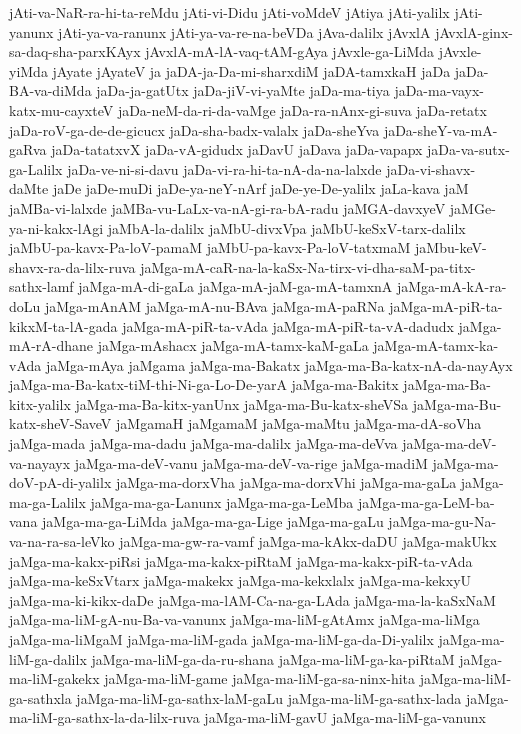 {jAti-va-NaR-ra-hi-ta-reMdu
jAti-vi-Didu
jAti-voMdeV
jAtiya
jAti-yalilx
jAti-yanunx
jAti-ya-va-ranunx
jAti-ya-va-re-na-beVDa
jAva-dalilx
jAvxlA
jAvxlA-ginx-sa-daq-sha-parxKAyx
jAvxlA-mA-lA-vaq-tAM-gAya
jAvxle-ga-LiMda
jAvxle-yiMda
jAyate
jAyateV
ja
jaDA-ja-Da-mi-sharxdiM
jaDA-tamxkaH
jaDa
jaDa-BA-va-diMda
jaDa-ja-gatUtx
jaDa-jiV-vi-yaMte
jaDa-ma-tiya
jaDa-ma-vayx-katx-mu-cayxteV
jaDa-neM-da-ri-da-vaMge
jaDa-ra-nAnx-gi-suva
jaDa-retatx
jaDa-roV-ga-de-de-gicucx
jaDa-sha-badx-valalx
jaDa-sheYva
jaDa-sheY-va-mA-gaRva
jaDa-tatatxvX
jaDa-vA-gidudx
jaDavU
jaDava
jaDa-vapapx
jaDa-va-sutx-ga-Lalilx
jaDa-ve-ni-si-davu
jaDa-vi-ra-hi-ta-nA-da-na-lalxde
jaDa-vi-shavx-daMte
jaDe
jaDe-muDi
jaDe-ya-neY-nArf
jaDe-ye-De-yalilx
jaLa-kava
jaM
jaMBa-vi-lalxde
jaMBa-vu-LaLx-va-nA-gi-ra-bA-radu
jaMGA-davxyeV
jaMGe-ya-ni-kakx-lAgi
jaMbA-la-dalilx
jaMbU-divxVpa
jaMbU-keSxV-tarx-dalilx
jaMbU-pa-kavx-Pa-loV-pamaM
jaMbU-pa-kavx-Pa-loV-tatxmaM
jaMbu-keV-shavx-ra-da-lilx-ruva
jaMga-mA-caR-na-la-kaSx-Na-tirx-vi-dha-saM-pa-titx-sathx-lamf
jaMga-mA-di-gaLa
jaMga-mA-jaM-ga-mA-tamxnA
jaMga-mA-kA-ra-doLu
jaMga-mAnAM
jaMga-mA-nu-BAva
jaMga-mA-paRNa
jaMga-mA-piR-ta-kikxM-ta-lA-gada
jaMga-mA-piR-ta-vAda
jaMga-mA-piR-ta-vA-dadudx
jaMga-mA-rA-dhane
jaMga-mAshacx
jaMga-mA-tamx-kaM-gaLa
jaMga-mA-tamx-ka-vAda
jaMga-mAya
jaMgama
jaMga-ma-Bakatx
jaMga-ma-Ba-katx-nA-da-nayAyx
jaMga-ma-Ba-katx-tiM-thi-Ni-ga-Lo-De-yarA
jaMga-ma-Bakitx
jaMga-ma-Ba-kitx-yalilx
jaMga-ma-Ba-kitx-yanUnx
jaMga-ma-Bu-katx-sheVSa
jaMga-ma-Bu-katx-sheV-SaveV
jaMgamaH
jaMgamaM
jaMga-maMtu
jaMga-ma-dA-soVha
jaMga-mada
jaMga-ma-dadu
jaMga-ma-dalilx
jaMga-ma-deVva
jaMga-ma-deV-va-nayayx
jaMga-ma-deV-vanu
jaMga-ma-deV-va-rige
jaMga-madiM
jaMga-ma-doV-pA-di-yalilx
jaMga-ma-dorxVha
jaMga-ma-dorxVhi
jaMga-ma-gaLa
jaMga-ma-ga-Lalilx
jaMga-ma-ga-Lanunx
jaMga-ma-ga-LeMba
jaMga-ma-ga-LeM-ba-vana
jaMga-ma-ga-LiMda
jaMga-ma-ga-Lige
jaMga-ma-gaLu
jaMga-ma-gu-Na-va-na-ra-sa-leVko
jaMga-ma-gw-ra-vamf
jaMga-ma-kAkx-daDU
jaMga-makUkx
jaMga-ma-kakx-piRsi
jaMga-ma-kakx-piRtaM
jaMga-ma-kakx-piR-ta-vAda
jaMga-ma-keSxVtarx
jaMga-makekx
jaMga-ma-kekxlalx
jaMga-ma-kekxyU
jaMga-ma-ki-kikx-daDe
jaMga-ma-lAM-Ca-na-ga-LAda
jaMga-ma-la-kaSxNaM
jaMga-ma-liM-gA-nu-Ba-va-vanunx
jaMga-ma-liM-gAtAmx
jaMga-ma-liMga
jaMga-ma-liMgaM
jaMga-ma-liM-gada
jaMga-ma-liM-ga-da-Di-yalilx
jaMga-ma-liM-ga-dalilx
jaMga-ma-liM-ga-da-ru-shana
jaMga-ma-liM-ga-ka-piRtaM
jaMga-ma-liM-gakekx
jaMga-ma-liM-game
jaMga-ma-liM-ga-sa-ninx-hita
jaMga-ma-liM-ga-sathxla
jaMga-ma-liM-ga-sathx-laM-gaLu
jaMga-ma-liM-ga-sathx-lada
jaMga-ma-liM-ga-sathx-la-da-lilx-ruva
jaMga-ma-liM-gavU
jaMga-ma-liM-ga-vanunx
}

